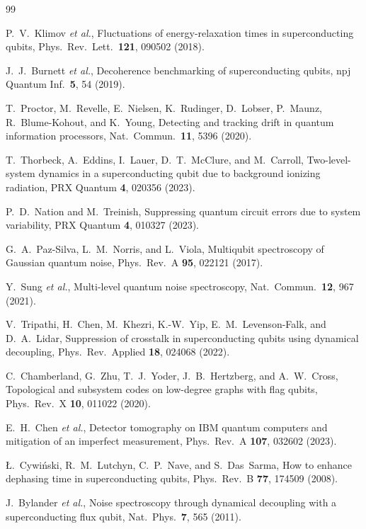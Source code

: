 \documentclass[twocolumn,aps,prapplied,superscriptaddress,floatfix]{revtex4-2}
\begin{document}
\begin{thebibliography}{99}

P.~V.~Klimov \emph{et al.}, Fluctuations of energy-relaxation times in superconducting qubits, Phys.\ Rev.\ Lett.\ \textbf{121}, 090502 (2018).

J.~J.~Burnett \emph{et al.}, Decoherence benchmarking of superconducting qubits, npj Quantum Inf.\ \textbf{5}, 54 (2019).

T.~Proctor, M.~Revelle, E.~Nielsen, K.~Rudinger, D.~Lobser, P.~Maunz, R.~Blume-Kohout, and K.~Young, Detecting and tracking drift in quantum information processors, Nat.\ Commun.\ \textbf{11}, 5396 (2020).

T.~Thorbeck, A.~Eddins, I.~Lauer, D.~T.~McClure, and M.~Carroll, Two-level-system dynamics in a superconducting qubit due to background ionizing radiation, PRX Quantum \textbf{4}, 020356 (2023).

P.~D.~Nation and M.~Treinish, Suppressing quantum circuit errors due to system variability, PRX Quantum \textbf{4}, 010327 (2023).

G.~A.~Paz-Silva, L.~M.~Norris, and L.~Viola, Multiqubit spectroscopy of Gaussian quantum noise, Phys.\ Rev.\ A \textbf{95}, 022121 (2017).

Y.~Sung \emph{et al.}, Multi-level quantum noise spectroscopy, Nat.\ Commun.\ \textbf{12}, 967 (2021).

V.~Tripathi, H.~Chen, M.~Khezri, K.-W.~Yip, E.~M.~Levenson-Falk, and D.~A.~Lidar, Suppression of crosstalk in superconducting qubits using dynamical decoupling, Phys.\ Rev.\ Applied \textbf{18}, 024068 (2022).

C.~Chamberland, G.~Zhu, T.~J.~Yoder, J.~B.~Hertzberg, and A.~W.~Cross, Topological and subsystem codes on low-degree graphs with flag qubits, Phys.\ Rev.\ X \textbf{10}, 011022 (2020).

E.~H.~Chen \emph{et al.}, Detector tomography on IBM quantum computers and mitigation of an imperfect measurement, Phys.\ Rev.\ A \textbf{107}, 032602 (2023).

{\L}.~Cywi{\'n}ski, R.~M.~Lutchyn, C.~P.~Nave, and S.~Das~Sarma, How to enhance dephasing time in superconducting qubits, Phys.\ Rev.\ B \textbf{77}, 174509 (2008).

J.~Bylander \emph{et al.}, Noise spectroscopy through dynamical decoupling with a superconducting flux qubit, Nat.\ Phys.\ \textbf{7}, 565 (2011).


\end{thebibliography}
\end{document}
